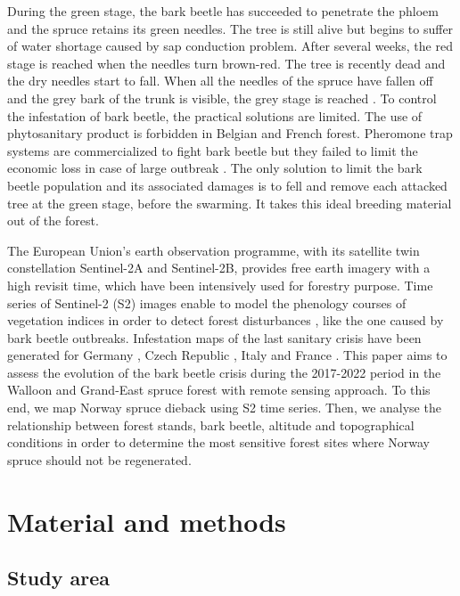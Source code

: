 \documentclass[3p,procedia]{elsarticle}
\begin{document}
During the green stage, the bark beetle has succeeded to penetrate the phloem and the spruce retains its green needles. 
The tree is still alive but begins to suffer of water shortage caused by sap conduction problem. 
After several weeks, the red stage is reached when the needles turn brown-red. The tree is recently dead and the dry needles start to fall.
When all the needles of the spruce have fallen off and the grey bark of the trunk is visible, the grey stage is reached \citep{abdullah_european_2018}. 
To control the infestation of bark beetle, the practical solutions are limited. 
The use of phytosanitary product is forbidden in Belgian and French forest.
Pheromone trap systems are commercialized to fight bark beetle but they failed to limit the economic loss in case of large outbreak \citep{kuhn_pheromone_2022}.
The only solution to limit the bark beetle population and its associated damages is to fell and remove each attacked tree at the green stage, before the swarming.
It takes this ideal breeding material out of the forest.

The European Union’s earth observation programme, with its satellite twin constellation Sentinel-2A and Sentinel-2B, provides free earth imagery with a high revisit time, which have been intensively used for forestry purpose. 
Time series of Sentinel-2 (S2) images enable to model the phenology courses of vegetation indices in order to detect forest disturbances \citep{low_phenology_2020}, like the one caused by bark beetle outbreaks.
Infestation maps of the last sanitary crisis have been generated for Germany \citep{ali_canopy_2021,thonfeld_first_2022}, Czech Republic \citep{barta_early_2021}, Italy \citep{dalponte_mapping_2022} and France \citep{nardi_drought_2022}. 
This paper aims to assess the evolution of the bark beetle crisis during the 2017-2022 period in the Walloon and  Grand-East spruce forest with remote sensing approach.
To this end, we map Norway spruce dieback using S2 time series.
Then, we analyse the relationship between forest stands, bark beetle, altitude and topographical conditions in order to determine the most sensitive forest sites where Norway spruce should not be regenerated.


\section{Material and methods}
\subsection{Study area}
\end{document}
